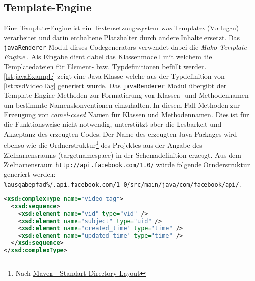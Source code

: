 \subsection{Template-Engine}
\label{sec:template}

Eine Template-Engine ist ein Textersetzungssystem was Templates (Vorlagen) verarbeitet und darin enthaltene Platzhalter durch andere Inhalte ersetzt. Das \texttt{javaRenderer} Modul dieses Codegenerators verwendet dabei die \emph{Mako Template-Engine} \cite{mako}. Als Eingabe dient dabei das Klassenmodell mit welchem die Templatedateien für Element- bzw. Typdefinitionen befüllt werden. \cref{lst:javaExample} zeigt eine Java-Klasse welche aus der Typdefinition von \cref{lst:xsdVideoTag} generiert wurde. Das \texttt{javaRenderer} Modul übergibt der Template-Engine Methoden zur Formatierung von Klassen- und Methodennamen um bestimmte Namenskonventionen einzuhalten. In diesem Fall Methoden zur Erzeugung von \emph{camel-cased} Namen für Klassen und Methodennamen. Dies ist für die Funktionsweise nicht notwendig, unterstützt aber die Lesbarkeit und Akzeptanz des erzeugten Codes.
Der Name des erzeugten Java Packages wird ebenso wie die Ordnerstruktur\footnote{Nach \href{http://maven.apache.org/guides/introduction/introduction-to-the-standard-directory-layout.html}{Maven - Standart Directory Layout}} des Projektes aus der Angabe des Zielnamensraums (targetnamespace) in der Schemadefinition erzeugt. Aus dem Zielnamensraum \texttt{http://api.facebook.com/1.0/} würde folgende Ornderstruktur generiert werden: \\
\texttt{\%ausgabepfad\%/.api.facebook.com/1\_0/src/main/java/com/facebook/api/}.

\begin{lstlisting}[language=XML, label=lst:xsdVideoTag, caption=Beispiel für eine XSD Typdefinition aus \cite{facebookXSD}]
<xsd:complexType name="video_tag">
  <xsd:sequence>
    <xsd:element name="vid" type="vid" />
    <xsd:element name="subject" type="uid" />
    <xsd:element name="created_time" type="time" />
    <xsd:element name="updated_time" type="time" />
  </xsd:sequence>
</xsd:complexType>
\end{lstlisting}

